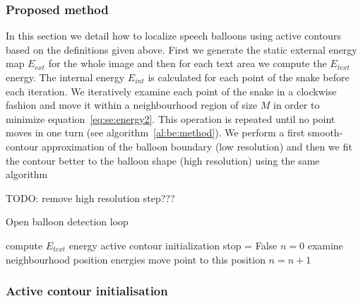 \subsubsection{Proposed method}
\label{sec:proposed_method}

In this section we detail how to localize speech balloons using active contours based on the definitions given above. 
First we generate the static external energy map $E_{ext}$ for the whole image and then for each text area we compute the $E_{text}$ energy.
The internal energy $E_{int}$ is calculated for each point of the snake before each iteration.
We iteratively examine each point of the snake in a clockwise fashion and move it within a neighbourhood region of size $M$ in order to minimize equation~\ref{eq:se:energy2}.
This operation is repeated until no point moves in one turn (see algorithm~\ref{al:be:method}).
We perform a first smooth-contour approximation of the balloon boundary (low resolution) and then we fit the contour better to the balloon shape (high resolution) using the same algorithm

TODO: remove high resolution step???

\begin{algorithm}
\caption{Open balloon detection loop}
\label{al:be:method}
\begin{algorithmic}
  \STATE compute $E_{text}$ energy
  \STATE active contour initialization
  \STATE stop = False
    \STATE $n = 0$
      \STATE examine neighbourhood position energies
		\STATE move point to this position
		\STATE $n=n+1$
      \ENDIF
    \ENDFOR
    \ENDIF
  \ENDWHILE%
\ENDFOR
\end{algorithmic}
\end{algorithm}

\subsubsection{Active contour initialisation}
\label{sec:se:cont_init}

